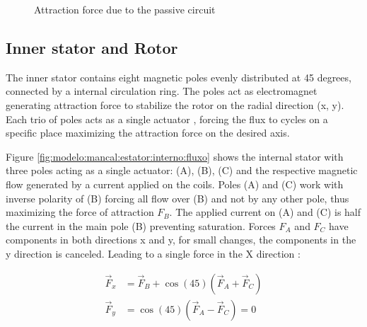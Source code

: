 \documentclass[10pt,fleqn,a4paper,twoside]{article}
\begin{document}
	
	\begin{figure}[ht]
		\hfill
		\caption{Attraction force due to the passive circuit}
		\label{fig:forca:passivo}
	\end{figure}	
	
%	
	
	\subsection{Inner stator and Rotor}
	
	The inner stator contains eight magnetic poles evenly distributed at 45 degrees, connected by a internal circulation ring. The poles act as electromagnet generating attraction force to stabilize the rotor on the radial direction (x, y). Each trio of poles acts as a single actuator
	, forcing the flux to cycles on a specific place maximizing the attraction force on the desired axis.
	
	Figure \ref{fig:modelo:mancal:estator:interno:fluxo} shows the internal stator with three poles acting as a single actuator: (A), (B), (C) and the respective magnetic flow generated by a current applied on the coils. Poles (A) and (C) work with inverse polarity of (B) forcing all flow over (B) and not by any other pole, thus maximizing the force of attraction $F_B$. The applied current on (A) and (C) is half the current in the main pole (B) preventing saturation.	Forces $F_A$ and $F_C$  have components in both directions x and y, for small changes, the components in the y direction is canceled. Leading to a single force in the X direction :
	
	
	\begin{align}
		\vec{F}_x &= \vec{F}_B + \cos(45) (\vec{F}_{A} + \vec{F}_{C}) \label{eq:ativo:F:resultante:y} \\
		\vec{F}_y &=  \cos(45) (\vec{F}_{A} - \vec{F}_{C}) = 0 \label{eq:ativo:F:resultante:x}
	\end{align}	
	
\end{document}
